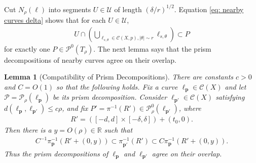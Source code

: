 \documentclass[12pt]{amsart}
\numberwithin{equation}{section}
\newtheorem{lemma}{Lemma}[section]
\newcommand{\cC}{\mathcal C}
\renewcommand{\cC}{{\mathcal C}}
\newcommand{\R}{\mathbb{R}}
\newcommand{\1}{\mathbbm{1}}
\newcommand{\p}{\mathbf p}
\begin{document}
Cut $N_\rho(\ell)$ into segments $U \in \mathcal U$ of length $(\delta /r)^{1/2}$.
Equation \eqref{eq: nearby curves delta} shows that for each $U \in \mathcal U$, 
\begin{align}
    U \cap (\bigcup_{\ell_{s,\theta} \in \mathcal C(X,p), |\theta| \sim r} \ell_{s,\theta}) \subset P
\end{align}
for exactly one $P \in \mathcal P^0(T_\rho)$. 
The next lemma says that the prism decompositions of nearby curves agree on their overlap. 
\begin{lemma}[Compatibility of Prism Decompositions]\label{lem: prism compatibility}
    There are constants $c >0$ and $C = O(1)$ so that the following holds. Fix a curve $\ell_\p \in \cC(X)$ and let 
    $\mathcal P = \mathcal P_\rho(\ell_\p)$ be its prism decomposition. Consider $\ell_{\p'} \in \cC(X)$ 
    satisfying $d(\ell_\p, \ell_{\p'}) \leq c\rho$, and fix $P' = \pi^{-1}(R') \in \mathcal P^0_\rho(\ell_{\p'})$, where
    \begin{align}
        R' = ([-d, d] \times [-\delta, \delta]) + (t_0,0). 
    \end{align}
    Then there is a $y = O(\rho) \in \R$ such that 
    \begin{align}
        C^{-1} \pi_\p^{-1}(R' + (0,y)) \subset \pi_{\p'}^{-1}(R') \subset C \pi_\p^{-1}(R' + (0,y)). 
    \end{align}
    Thus the prism decompositions of $\ell_\p$ and $\ell_{\p'}$ agree on their overlap. 
\end{lemma}
\end{document}
